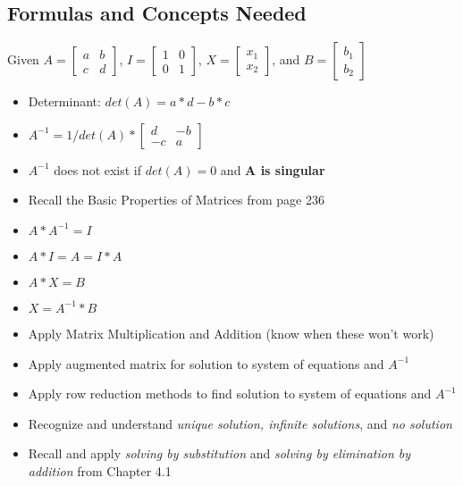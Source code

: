 \documentclass[12pt]{article}
\begin{document}
\subsection*{Formulas  and Concepts Needed}
Given $A = \begin{bmatrix}
a & b \\
c & d
\end{bmatrix}$, $I = \begin{bmatrix}
1 & 0 \\
0 & 1
\end{bmatrix}$, $X = \begin{bmatrix}
x_1 \\
x_2
\end{bmatrix}$, and $B = \begin{bmatrix}
b_1 \\
b_2
\end{bmatrix}
$

\begin{itemize}
\item Determinant: $det(A) = a*d - b*c$
\item $A^{-1} = 1/det(A) * \begin{bmatrix}
d & -b \\
-c & a
\end{bmatrix}
$
\item $A^{-1}$ does not exist if $det(A)=0$ and \textbf{A is singular}
\item Recall the Basic Properties of Matrices from page 236
\item $A * A^{-1} = I$
\item $A * I = A = I*A$
\item $A*X = B$
\item $X = A^{-1}*B$
\item Apply Matrix Multiplication and Addition (know when these won't work)
\item Apply augmented matrix for solution to system of equations and $A^{-1}$
\item Apply row reduction methods to find solution to system of equations and $A^{-1}$
\item Recognize and understand \textit{unique solution, infinite solutions}, and \textit{no solution}
\item Recall and apply \textit{solving by substitution} and \textit{solving by elimination by addition} from Chapter 4.1
\end{itemize}
\end{document}
